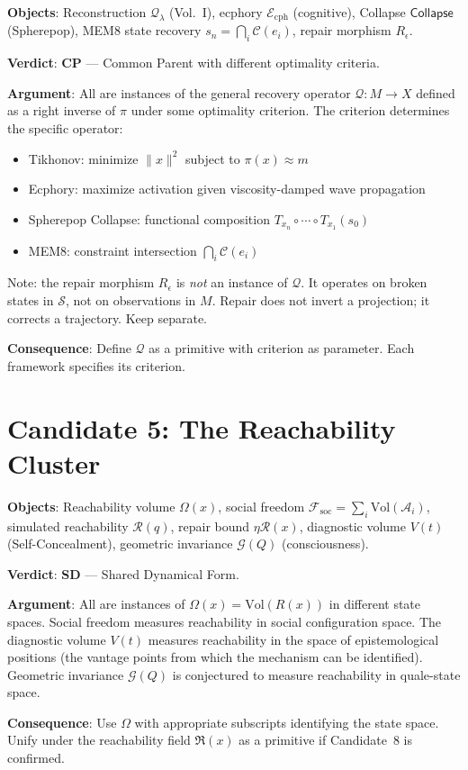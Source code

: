\documentclass[11pt, a4paper]{book}
\theoremstyle{flyxion}
\theoremstyle{remark}
\begin{document}
\begin{flybox}
\textbf{Objects}: Reconstruction $\mathcal{Q}_\lambda$ (Vol.~I),
ecphory $\mathcal{E}_\mathrm{cph}$ (cognitive), Collapse
$\mathsf{Collapse}$ (Spherepop), MEM\textbar{}8 state recovery
$s_n = \bigcap_i \mathcal{C}(e_i)$, repair morphism $R_\epsilon$.

\textbf{Verdict}: \textbf{CP} --- Common Parent with different
optimality criteria.

\textbf{Argument}: All are instances of the general recovery
operator $\mathcal{Q}: M \to X$ defined as a right inverse of
$\pi$ under some optimality criterion. The criterion determines
the specific operator:
\begin{itemize}
\item Tikhonov: minimize $\|x\|^2$ subject to $\pi(x) \approx m$
\item Ecphory: maximize activation given viscosity-damped wave propagation
\item Spherepop Collapse: functional composition
  $T_{x_n} \circ \cdots \circ T_{x_1}(s_0)$
\item MEM\textbar{}8: constraint intersection
  $\bigcap_i \mathcal{C}(e_i)$
\end{itemize}
Note: the repair morphism $R_\epsilon$ is \emph{not} an instance of
$\mathcal{Q}$. It operates on broken states in $\mathcal{S}$, not
on observations in $M$. Repair does not invert a projection; it
corrects a trajectory. Keep separate.

\textbf{Consequence}: Define $\mathcal{Q}$ as a primitive with
criterion as parameter. Each framework specifies its criterion.
\end{flybox}

\section{Candidate 5: The Reachability Cluster}

\begin{flybox}
\textbf{Objects}: Reachability volume $\Omega(x)$, social freedom
$\mathcal{F}_\mathrm{soc} = \sum_i\mathrm{Vol}(\mathcal{A}_i)$,
simulated reachability $\mathcal{R}(q)$, repair bound
$\eta\mathcal{R}(x)$, diagnostic volume $V(t)$ (Self-Concealment),
geometric invariance $\mathcal{G}(Q)$ (consciousness).

\textbf{Verdict}: \textbf{SD} --- Shared Dynamical Form.

\textbf{Argument}: All are instances of $\Omega(x) =
\mathrm{Vol}(R(x))$ in different state spaces. Social freedom
measures reachability in social configuration space. The diagnostic
volume $V(t)$ measures reachability in the space of epistemological
positions (the vantage points from which the mechanism can be
identified). Geometric invariance $\mathcal{G}(Q)$ is conjectured
to measure reachability in quale-state space.

\textbf{Consequence}: Use $\Omega$ with appropriate subscripts
identifying the state space. Unify under the reachability field
$\mathfrak{R}(x)$ as a primitive if Candidate~8 is confirmed.
\end{flybox}
\end{document}
